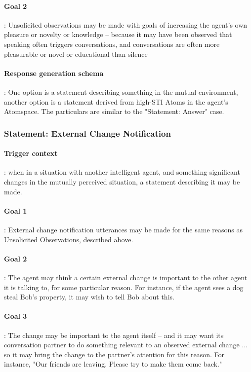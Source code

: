 \documentclass[10pt]{article}
\begin{document}
\paragraph{Goal 2}: Unsolicited observations may be made with goals of increasing the agent's own pleasure or novelty or knowledge -- because it may have been observed that speaking often triggers conversations, and conversations are often more pleasurable or novel or educational than silence

\paragraph{Response generation schema}: One option is a statement describing something in the mutual environment, another option is a statement derived from high-STI Atoms in the agent's Atomspace.  The particulars are similar to the "Statement: Answer" case.

\subsubsection{Statement: External Change Notification}

\paragraph{Trigger context}: when in a situation with another intelligent agent, and something significant changes in the mutually perceived situation, a statement describing it may be made.

\paragraph{Goal 1}: External change notification utterances may be made for the same reasons as Unsolicited Observations, described above. 

\paragraph{Goal 2}: The agent may think a certain external change is important to the other agent it is talking to, for some particular reason.  For instance, if the agent sees a dog steal Bob's property, it may wish to tell Bob about this.

\paragraph{Goal 3}: The change may be important to the agent itself -- and it may want its conversation partner to do something relevant to an observed external change ... so it may bring the change to the partner's attention for this reason.  For instance, "Our friends are leaving.  Please try to make them come back."
\end{document}
